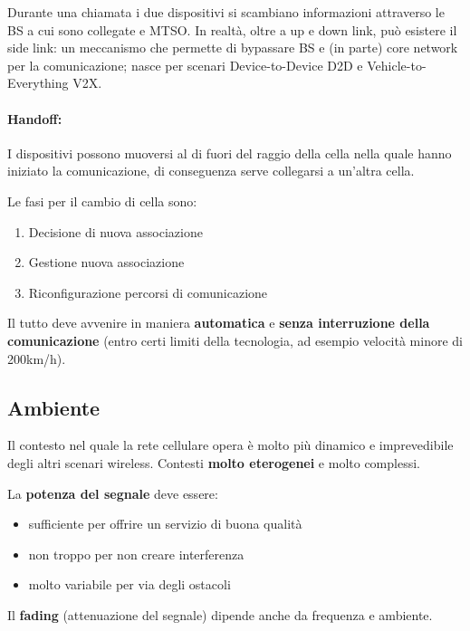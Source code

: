 Durante una chiamata i due dispositivi si scambiano informazioni attraverso le BS a cui sono collegate e MTSO. In realtà, oltre a up e down link, può esistere il side link: un meccanismo che permette di bypassare BS e (in parte) core network per la comunicazione; nasce per scenari Device-to-Device D2D e Vehicle-to-Everything V2X.

\paragraph{Handoff:} I dispositivi possono muoversi al di fuori del raggio della cella nella quale hanno iniziato la comunicazione, di conseguenza serve collegarsi a un'altra cella. 

Le fasi per il cambio di cella sono:
\begin{enumerate}
	\item Decisione di nuova associazione

	\item Gestione nuova associazione

	\item Riconfigurazione percorsi di comunicazione
\end{enumerate}

Il tutto deve avvenire in maniera \textbf{automatica} e \textbf{senza interruzione della comunicazione} (entro certi limiti della tecnologia, ad esempio velocità minore di 200km/h).

\subsection{Ambiente}

Il contesto nel quale la rete cellulare opera è molto più dinamico e imprevedibile degli altri scenari wireless. Contesti \textbf{molto eterogenei} e molto complessi. 

La \textbf{potenza del segnale} deve essere: 
\begin{itemize}
	\item sufficiente per offrire un servizio di buona qualità

	\item non troppo per non creare interferenza

	\item molto variabile per via degli ostacoli
\end{itemize}

Il \textbf{fading} (attenuazione del segnale) dipende anche da frequenza e ambiente.

